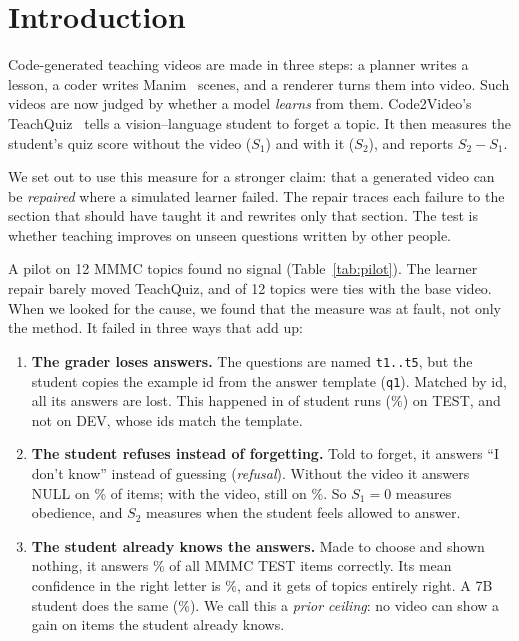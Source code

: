 \section{Introduction}


Code-generated teaching videos are made in three steps: a planner writes a lesson, a coder writes Manim~\cite{manim}
scenes, and a renderer turns them into video. Such videos are now judged by whether a model \emph{learns} from them.
Code2Video's TeachQuiz~\cite{code2video} tells a vision--language student to forget a topic. It then measures the
student's quiz score without the video ($S_1$) and with it ($S_2$), and reports $S_2 - S_1$.

We set out to use this measure for a stronger claim: that a generated video can be \emph{repaired} where a simulated
learner failed. The repair traces each failure to the section that should have taught it and rewrites only that
section. The test is whether teaching improves on unseen questions written by other people.

A pilot on 12 MMMC topics found no signal (Table~\ref{tab:pilot}). The learner repair barely moved TeachQuiz, and
\PilotTies{} of 12 topics were ties with the base video. When we looked for the cause, we found that the measure was
at fault, not only the method. It failed in three ways that add up:
\begin{enumerate}
  \item \textbf{The grader loses answers.} The questions are named \texttt{t1..t5}, but the student copies the
  example id from the answer template (\texttt{q1}). Matched by id, all its answers are lost. This happened in \OrderRuns{} of \AllRuns{} student
  runs (\OrderShare\%) on TEST, and not on DEV, whose ids match the template.
  \item \textbf{The student refuses instead of forgetting.} Told to forget, it
  answers ``I don't know'' instead of guessing (\emph{refusal}). Without the video it answers NULL on \NullNoVideo\% of
  items; with the video, still on \NullWithVideo\%. So $S_1 = 0$ measures obedience, and $S_2$ measures when the student
  feels allowed to answer.
  \item \textbf{The student already knows the answers.} Made to choose and shown nothing, it answers
  \mmmcpriorGemmaAcc\% of all MMMC TEST items correctly. Its mean confidence in the right letter is
  \mmmcpriorGemmaP\%, and it gets \mmmcpriorGemmaAllRight{} of \mmmcpriorGemmaTopics{} topics entirely right. A 7B
  student does the same (\mmmcpriorQwenAcc\%). We call this a \emph{prior ceiling}: no video can show a gain on items
  the student already knows.
\end{enumerate}

